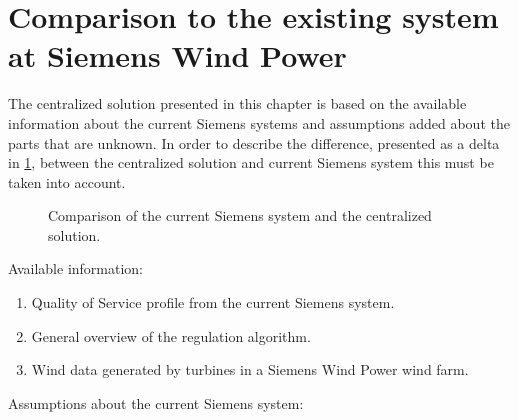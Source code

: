 




\section{Comparison to the existing system at Siemens Wind Power}
The centralized solution presented in this chapter is based on the available information about the current Siemens systems and assumptions added about the parts that are unknown. In order to describe the difference, presented as a delta in \cref{fig:projectDiffOverviewCentralizedSiemens}, between the centralized solution and current Siemens system this must be taken into account.

\begin{figure}[!h]
	\centering
	
	\caption[Comparison of the current Siemens system and the centralized solution]{
		\label{fig:projectDiffOverviewCentralizedSiemens} 
		\footnotesize{%
			Comparison of the current Siemens system and the centralized solution.
		}
	}
\end{figure}

Available information:

\begin{enumerate}
	\item Quality of Service profile from the current Siemens system.
	\item General overview of the regulation algorithm.
	\item Wind data generated by turbines in a Siemens Wind Power wind farm.
\end{enumerate}

Assumptions about the current Siemens system:


